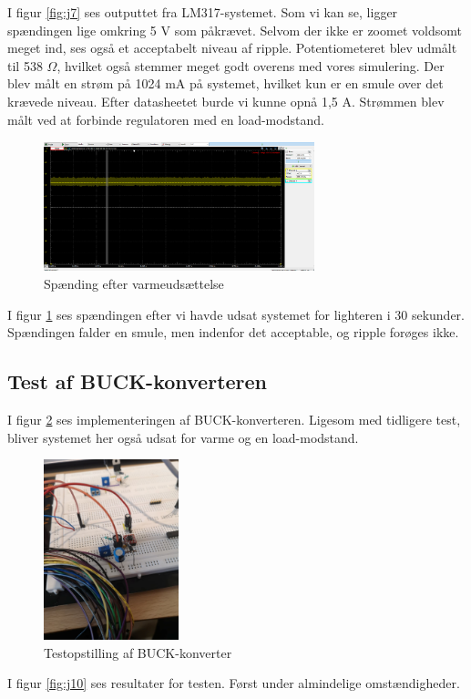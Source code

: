 I figur \ref{fig:j7} ses outputtet fra LM317-systemet. Som vi kan se, ligger spændingen lige omkring 5 V som påkrævet. Selvom der ikke er zoomet voldsomt meget ind, ses også et acceptabelt niveau af ripple. Potentiometeret blev udmålt til 538 $\Omega$, hvilket også stemmer meget godt overens med vores simulering. Der blev målt en strøm på 1024 mA på systemet, hvilket kun er en smule over det krævede niveau. Efter datasheetet burde vi kunne opnå 1,5 A. Strømmen blev målt ved at forbinde regulatoren med en load-modstand.
\clearpage
\begin{figure}[h]
  \centering
  \includegraphics[width=0.7\textwidth]{./figurer/j8.png}
  \caption{Spænding efter varmeudsættelse}
  \label{fig:j8}
\end{figure}

I figur \ref{fig:j8} ses spændingen efter vi havde udsat systemet for lighteren i 30 sekunder. Spændingen falder en smule, men indenfor det acceptable, og ripple forøges ikke.

\subsection{Test af BUCK-konverteren}
\label{sec:test-af-buck}

I figur \ref{fig:j9} ses implementeringen af BUCK-konverteren. Ligesom med tidligere test, bliver systemet her også udsat for varme og en load-modstand. 

\begin{figure}[h]
  \centering
  \includegraphics[width=0.35\textwidth]{./figurer/j9.png}
  \caption{Testopstilling af BUCK-konverter}
  \label{fig:j9}
\end{figure}
\clearpage
I figur \ref{fig:j10} ses resultater for testen. Først under almindelige omstændigheder.


